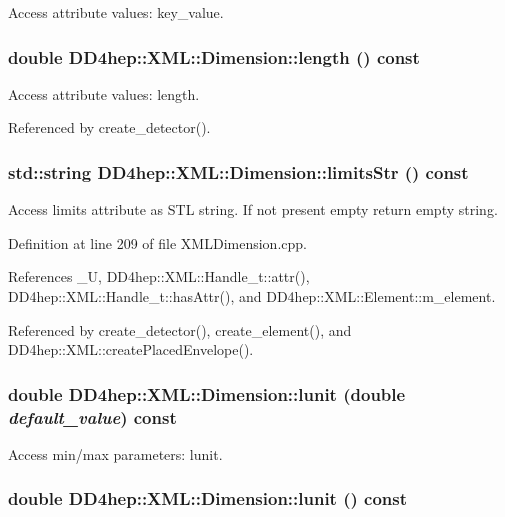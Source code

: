 Access attribute values: key\_\-value. \hypertarget{struct_d_d4hep_1_1_x_m_l_1_1_dimension_a665ee43ef0013ca8fcf34a1e1bc276ad}{
\subsubsection[{length}]{\setlength{\rightskip}{0pt plus 5cm}double DD4hep::XML::Dimension::length () const}}
\label{struct_d_d4hep_1_1_x_m_l_1_1_dimension_a665ee43ef0013ca8fcf34a1e1bc276ad}


Access attribute values: length. 

Referenced by create\_\-detector().\hypertarget{struct_d_d4hep_1_1_x_m_l_1_1_dimension_a389d11b87b3ad9d752cb6efd514c2b4b}{
\subsubsection[{limitsStr}]{\setlength{\rightskip}{0pt plus 5cm}std::string DD4hep::XML::Dimension::limitsStr () const}}
\label{struct_d_d4hep_1_1_x_m_l_1_1_dimension_a389d11b87b3ad9d752cb6efd514c2b4b}


Access limits attribute as STL string. If not present empty return empty string. 

Definition at line 209 of file XMLDimension.cpp.

References \_\-U, DD4hep::XML::Handle\_\-t::attr(), DD4hep::XML::Handle\_\-t::hasAttr(), and DD4hep::XML::Element::m\_\-element.

Referenced by create\_\-detector(), create\_\-element(), and DD4hep::XML::createPlacedEnvelope().\hypertarget{struct_d_d4hep_1_1_x_m_l_1_1_dimension_a5a6b0e171412756cf3f1e97609f71404}{
\subsubsection[{lunit}]{\setlength{\rightskip}{0pt plus 5cm}double DD4hep::XML::Dimension::lunit (double {\em default\_\-value}) const}}
\label{struct_d_d4hep_1_1_x_m_l_1_1_dimension_a5a6b0e171412756cf3f1e97609f71404}


Access min/max parameters: lunit. \hypertarget{struct_d_d4hep_1_1_x_m_l_1_1_dimension_a625e97d42353e36b1233980ccdacc701}{
\subsubsection[{lunit}]{\setlength{\rightskip}{0pt plus 5cm}double DD4hep::XML::Dimension::lunit () const}}
\label{struct_d_d4hep_1_1_x_m_l_1_1_dimension_a625e97d42353e36b1233980ccdacc701}


